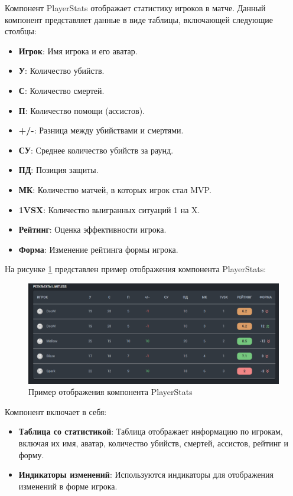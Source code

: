 Компонент PlayerStats отображает статистику игроков в матче. Данный компонент представляет данные в виде таблицы, включающей следующие столбцы:

\begin{itemize}
	\item \textbf{Игрок}: Имя игрока и его аватар.
	\item \textbf{У}: Количество убийств.
	\item \textbf{С}: Количество смертей.
	\item \textbf{П}: Количество помощи (ассистов).
	\item \textbf{+/-}: Разница между убийствами и смертями.
	\item \textbf{СУ}: Среднее количество убийств за раунд.
	\item \textbf{ПД}: Позиция защиты.
	\item \textbf{МК}: Количество матчей, в которых игрок стал MVP.
	\item \textbf{1VSX}: Количество выигранных ситуаций 1 на X.
	\item \textbf{Рейтинг}: Оценка эффективности игрока.
	\item \textbf{Форма}: Изменение рейтинга формы игрока.
\end{itemize}

На рисунке \ref{fig:PlayerStats} представлен пример отображения компонента PlayerStats:

\begin{figure}
	\centering
	\includegraphics[width=0.95\linewidth]{images/PlayerStats}
	\caption{Пример отображения компонента PlayerStats}
	\label{fig:PlayerStats}
\end{figure}

Компонент включает в себя:
\begin{itemize}
	\item \textbf{Таблица со статистикой}: Таблица отображает информацию по игрокам, включая их имя, аватар, количество убийств, смертей, ассистов, рейтинг и форму.
	\item \textbf{Индикаторы изменений}: Используются индикаторы для отображения изменений в форме игрока.
\end{itemize}

